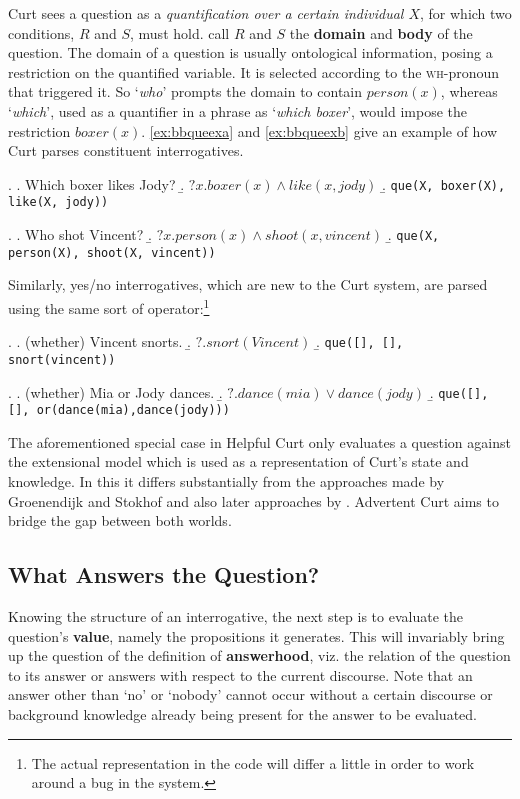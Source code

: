 \documentclass[notitlepage,twoside,a4paper]{scrreprt}
\newcommand{\stress}{\textbf} %
\newcommand{\term}[1]{\textsf{\textbf{#1}}} %
\newcommand{\code}[1]{\texttt{#1}} %
\newcommand{\pn}{\textsf} %
\newcommand{\example}[1]{`\textit{#1}'} %
\newcommand{\wh}{\textsc{wh}}
\newcommand{\curt}{\pn{Curt}}
\newcommand{\acurt}{\pn{Advertent Curt}}
\theoremstyle{remark}
\theoremstyle{remark}
\theoremstyle{definition}
\theoremstyle{definition}
\begin{document}
\curt{} sees a question as a \emph{quantification over a certain individual
$X$}, for which two conditions, $R$ and $S$, must hold. \cite{bosgabdsil} call
$R$ and $S$ the \term{domain} and \term{body} of the question. The domain of a
question is usually ontological information, posing a restriction on the
quantified variable. It is selected according to the \wh-pronoun that triggered
it. So \example{who} prompts the domain to contain $person(x)$, whereas
\example{which}, used as a quantifier in a phrase as \example{which boxer}, would
impose the restriction $boxer(x)$. \ref{ex:bbqueexa} and \ref{ex:bbqueexb} give
an example of how \curt{} parses constituent interrogatives.

\ex.\label{ex:bbqueexa}
\a. Which boxer likes Jody?
\b. $?x.boxer(x) \wedge like(x,jody)$
\b. \label{ex:bbqueparsea} \code{que(X, boxer(X), like(X, jody))}

\ex.\label{ex:bbqueexb}
\a. Who shot Vincent?
\b. $?x.person(x) \wedge shoot(x, vincent)$
\b. \label{ex:bbqueparseb} \code{que(X, person(X), shoot(X, vincent))}

Similarly, yes/no interrogatives, which are new to the \curt{} system, are
parsed using the same sort of operator:\footnote{The actual representation in
the code will differ a little in order to work around a bug in the system.}

\ex.
\a. (whether) Vincent snorts.
\b. $?.snort(Vincent)$
\b. \lstinline!que([], [], snort(vincent))!

\ex. \a. (whether) Mia or Jody dances.
\b. $?.dance(mia) \vee dance(jody)$
\b. \lstinline!que([], [], or(dance(mia),dance(jody)))!

The aforementioned special case in \pn{Helpful Curt} only evaluates a question
against the extensional model which is used as a representation of \curt's state
and knowledge. In this it differs substantially from the approaches made by
Groenendijk and Stokhof and also later approaches by \cite{g:is}. \acurt{}
aims to bridge the gap between both worlds.

\subsection{What Answers the Question?}\label{sec:answerhood}

Knowing the structure of an interrogative, the next step is to evaluate the
question's \stress{value}, namely the propositions it generates. This will
invariably bring up the question of the definition of \term{answerhood}, viz.
the relation of the question to its answer or answers with respect to the
current discourse. Note that an answer other than `no' or
`nobody' cannot occur without a certain discourse or background knowledge already being present
for the answer to be evaluated.
\end{document}
